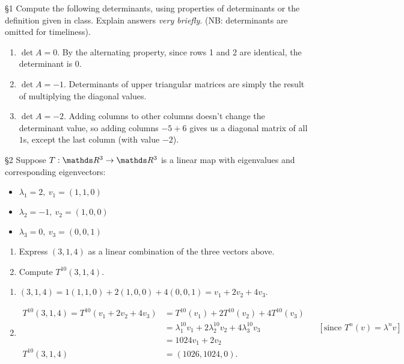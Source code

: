 \documentclass{homework}
\begin{document}
\begin{problem}{\S 1}
  Compute the following determinants, using properties of determinants or the definition given in
  class. Explain answers \textit{very briefly}. (NB: determinants are omitted for timeliness).
\end{problem}
\begin{solution}
  \begin{enumerate}[label=(\alph*)]
    \item $\det{A}=0$. By the alternating property, since rows 1 and 2 are identical, the
      determinant is $0$.
    \item $\det{A}=-1$. Determinants of upper triangular matrices are simply the result of
      multiplying the diagonal values.
    \item $\det{A}=-2$. Adding columns to other columns doesn't change the determinant value, so
      adding columns $-5 + 6$ gives us a diagonal matrix of all $1$s, except the last column (with
      value $-2$).
  \end{enumerate}
\end{solution}

\begin{problem}{\S 2}
  Suppose $T:\R^3\to \R^3$ is a linear map with eigenvalues and corresponding eigenvectors:
  \begin{itemize}
    \item $\lambda_1=2,\ v_1=(1,1,0)$
    \item $\lambda_2=-1,\ v_2=(1,0,0)$
    \item $\lambda_3=0,\ v_3=(0,0,1)$
  \end{itemize}
  \begin{enumerate}[label=(\alph*)]
    \item Express $(3,1,4)$ as a linear combination of the three vectors above.
    \item Compute $T^{10}(3,1,4)$.
  \end{enumerate}
\end{problem}

\begin{solution}
  \begin{enumerate}[label=(\alph*)]
    \item $(3,1,4)=1(1,1,0)+2(1,0,0)+4(0,0,1)=v_1+2v_2+4v_3$.
    \item
      \begin{align*}
        T^{10}(3,1,4)=T^{10}(v_1+2v_2+4v_3)&= T^{10}(v_1)+2T^{10}(v_2)+4T^{10}(v_3) \\
                                           &=
        \lambda_1^{10}v_1+2\lambda_2^{10}v_2+4\lambda_3^{10}v_3 && [\text{since
        $T^n(v)=\lambda^nv$}]\\
                                                                &= 1024v_1+2v_2\\
          T^{10}(3,1,4)&=(1026,1024,0)
      .\end{align*}
  \end{enumerate}
\end{solution}
\end{document}
